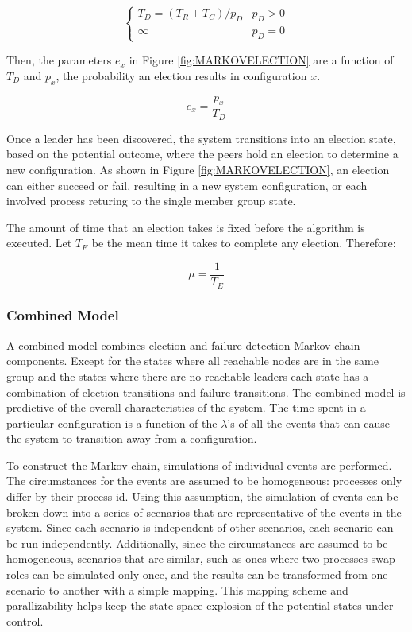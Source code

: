 \begin{equation}
\begin{cases}
T_{D} = ( T_{R}+T_{C} ) / p_{D} & p_{D} > 0 \\
\infty & p_{D} = 0
\end{cases}
\end{equation}

Then, the parameters $e_x$ in Figure \ref{fig:MARKOVELECTION} are a function of $T_{D}$ and $p_{x}$,
the probability an election results in configuration $x$.

\begin{equation}
e_x = \frac{p_{x}}{T_{D}}
\end{equation}

Once a leader has been discovered, the system transitions into an election state, based on the
potential outcome, where the peers hold an election to determine a new configuration. As shown
in Figure \ref{fig:MARKOVELECTION}, an election can either succeed or fail, resulting in a new system
configuration, or each involved process returing to the single member group state.
 
The amount of time that an election takes is fixed before the algorithm is executed. 
Let $T_{E}$ be the mean time it takes to complete any election. Therefore:

\begin{equation}
\mu = \frac{1}{T_{E}}
\end{equation}

\subsubsection{Combined Model}

A combined model combines election and failure detection Markov chain components. Except for the
states where all reachable nodes are in the same group and the states where there are no reachable
leaders each state has a combination of election transitions and failure transitions.                                                        
The combined model is predictive of the overall characteristics of the system. The
time spent in a particular configuration is a function of the $\lambda$'s of all the
events that can cause the system to transition away from a configuration. 

To construct the Markov chain, simulations of individual events are performed. The circumstances
for the events are assumed to be homogeneous: processes only differ by their process id.
Using this assumption, the simulation of events can be broken down into a series of scenarios
that are representative of the events in the system. Since each scenario is independent of other
scenarios, each scenario can be run independently.  Additionally, since the circumstances
are assumed to be homogeneous, scenarios that are similar, such as ones where two processes
swap roles can be simulated only once, and the results can be transformed from one scenario
to another with a simple mapping. This mapping scheme and parallizability helps keep the
state space explosion of the potential states under control.

